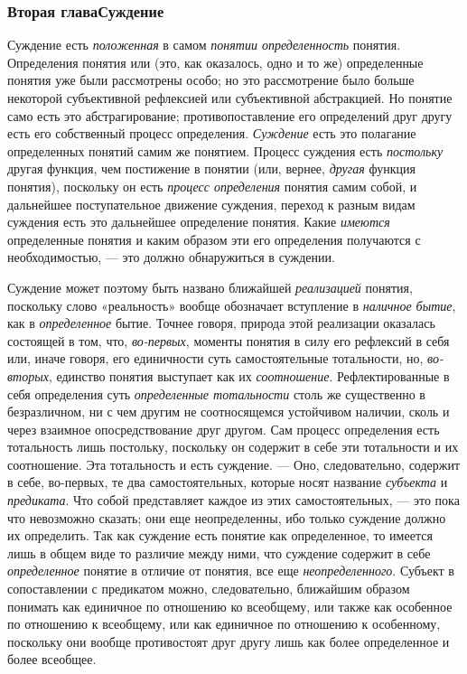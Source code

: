 \documentclass[twoside]{article}
\begin{document}
{{{\subsubsection[Вторая глава Суждение]{Вторая глава\newline Суждение}
Суждение есть
{\em положенная} в самом
{\em понятии определенность}
понятия. Определения понятия или (это, как оказалось, одно и
то же) определенные понятия уже были рассмотрены особо; но это рассмотрение
было больше некоторой субъективной рефлексией или субъективной абстракцией.
Но понятие само есть это абстрагирование; противопоставление его
определений друг другу есть его собственный процесс определения.
{\em Суждение} есть это
полагание определенных понятий самим же понятием. Процесс суждения есть
{\em постольку} другая
функция, чем постижение в понятии (или, вернее,
{\em другая} функция
понятия), поскольку он есть {\em процесс
определения} понятия самим собой, и дальнейшее
поступательное движение суждения, переход к разным видам
суждения есть это дальнейшее определение понятия. Какие
{\em имеются}
определенные понятия и каким образом эти его определения
получаются с необходимостью, — это должно обнаружиться в
суждении.

Суждение может поэтому быть названо ближайшей
{\em реализацией}
понятия, поскольку слово «реальность» вообще обозначает
вступление в {\em наличное бытие},
как в {\em определенное}
бытие. Точнее говоря, природа этой реализации оказалась
состоящей в том, что, {\em во-первых},
моменты понятия в силу его рефлексий в себя или, иначе
говоря, его единичности суть самостоятельные тотальности, но,
{\em во-вторых}, единство
понятия выступает как их
{\em соотношение}.
Рефлектированные в себя определения суть
{\em определенные тотальности
}столь же существенно в безразличном, ни с чем другим не
соотносящемся устойчивом наличии, сколь и через взаимное опосредствование
друг другом. Сам процесс определения есть тотальность лишь постольку,
поскольку он содержит в себе эти тотальности и их соотношение. Эта
тотальность и есть суждение. — Оно, следовательно, содержит
в себе, во-первых, те два самостоятельных, которые носят название
{\em субъекта} и
{\em предиката}. Что
собой представляет каждое из этих самостоятельных, — это
пока что невозможно сказать; они еще неопределенны, ибо только суждение
должно их определить. Так как суждение есть понятие как определенное, то
имеется лишь в общем виде то различие между ними, что суждение содержит в
себе {\em определенное}
понятие в отличие от понятия, все еще
{\em неопределенного}.
Субъект в сопоставлении с предикатом можно, следовательно,
ближайшим образом понимать как единичное по отношению ко всеобщему, или
также как особенное по отношению к всеобщему, или как единичное по
отношению к особенному, поскольку они вообще противостоят друг другу лишь
как более определенное и более всеобщее.

}}}
\end{document}

